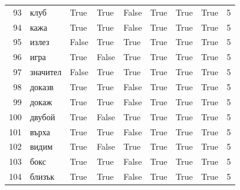 \begin{longtable}{rlllllllr}
  93 &        клуб &     True &   True &  False &       True &           True &      True &      5 \\
  94 &        кажа &     True &   True &  False &       True &           True &      True &      5 \\
  95 &       излез &    False &   True &   True &       True &           True &      True &      5 \\
  96 &        игра &     True &  False &   True &       True &           True &      True &      5 \\
  97 &    значител &    False &   True &   True &       True &           True &      True &      5 \\
  98 &      доказв &     True &   True &  False &       True &           True &      True &      5 \\
  99 &       докаж &     True &   True &  False &       True &           True &      True &      5 \\
 100 &      двубой &     True &  False &   True &       True &           True &      True &      5 \\
 101 &       върха &     True &   True &  False &       True &           True &      True &      5 \\
 102 &       видим &     True &  False &   True &       True &           True &      True &      5 \\
 103 &        бокс &     True &   True &  False &       True &           True &      True &      5 \\
 104 &      близък &     True &   True &  False &       True &           True &      True &      5 \\
\end{longtable}
